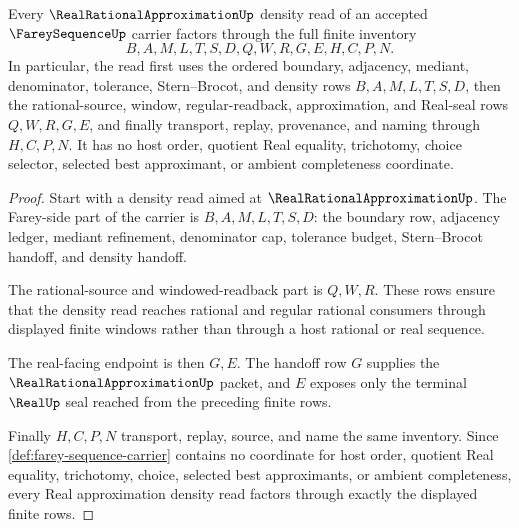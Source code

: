 \begin{theorem}
\label{thm:farey-sequence-real-approximation-density-route}
Every $\RealRationalApproximationUp$ density read of an accepted $\FareySequenceUp$ carrier factors through the full finite inventory
$$
B,A,M,L,T,S,D,Q,W,R,G,E,H,C,P,N.
$$
In particular, the read first uses the ordered boundary, adjacency, mediant, denominator, tolerance, Stern--Brocot, and density rows $B,A,M,L,T,S,D$, then the rational-source, window, regular-readback, approximation, and Real-seal rows $Q,W,R,G,E$, and finally transport, replay, provenance, and naming through $H,C,P,N$. It has no host order, quotient Real equality, trichotomy, choice selector, selected best approximant, or ambient completeness coordinate.
\end{theorem}
\begin{proof}
Start with a density read aimed at $\RealRationalApproximationUp$. The Farey-side part of the carrier is $B,A,M,L,T,S,D$: the boundary row, adjacency ledger, mediant refinement, denominator cap, tolerance budget, Stern--Brocot handoff, and density handoff.

The rational-source and windowed-readback part is $Q,W,R$. These rows ensure that the density read reaches rational and regular rational consumers through displayed finite windows rather than through a host rational or real sequence.

The real-facing endpoint is then $G,E$. The handoff row $G$ supplies the $\RealRationalApproximationUp$ packet, and $E$ exposes only the terminal $\RealUp$ seal reached from the preceding finite rows.

Finally $H,C,P,N$ transport, replay, source, and name the same inventory. Since \autoref{def:farey-sequence-carrier} contains no coordinate for host order, quotient Real equality, trichotomy, choice, selected best approximants, or ambient completeness, every Real approximation density read factors through exactly the displayed finite rows.
\end{proof}



